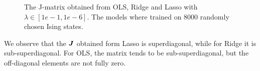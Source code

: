 \begin{figure} [H]
	\caption{The J-matrix obtained from OLS, Ridge and Lasso with $\lambda\in[1e-1,1e-6]$. The models where trained on 8000 randomly chosen Ising states.}%
	\label{fig:J_matrix}
\end{figure}
\restoregeometry
We observe that the $\boldsymbol{J}$ obtained form Lasso is superdiagonal, while for Ridge it is sub-superdiagonal. For OLS, the matrix tends to be sub-superdiagonal, but the off-diagonal elements are not fully zero. 


